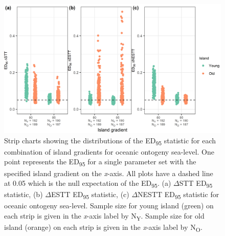 \begin{figure}
    \centering
    \includegraphics{oceanic_gradient_ontogeny_sea_level_nltt.png}
    \caption{Strip charts showing the distributions of the ED\textsubscript{95} statistic for each combination of island gradients for oceanic ontogeny sea-level. One point represents the ED\textsubscript{95} for a single parameter set with the specified island gradient on the \textit{x}-axis. All plots have a dashed line at 0.05 which is the null expectation of the ED\textsubscript{95}. (a) $\Delta$STT ED\textsubscript{95} statistic, (b) $\Delta$ESTT ED\textsubscript{95} statistic, (c) $\Delta$NESTT ED\textsubscript{95} statistic for oceanic ontogeny sea-level. Sample size for young island (green) on each strip is given in the \textit{x}-axis label by N\textsubscript{Y}. Sample size for old island (orange) on each strip is given in the \textit{x}-axis label by N\textsubscript{O}.}
    \label{fig:oceanic_gradient_ontogeny_sea_level_nltt}
\end{figure}

